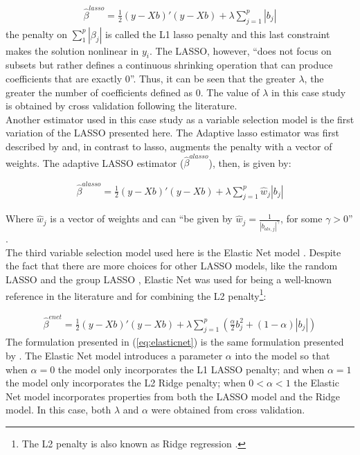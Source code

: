 \begin{align} \label{eq:lasso}
    \hat{\beta}^{lasso} = \frac{1}{2}(y - Xb)'(y - Xb) + \lambda\sum_{j=1}^p|b_j|
\end{align}
the penalty on $\sum_1 ^p |\beta_j|$ is called the L1 lasso penalty \cite[p.68]{hastie2009elements} and this last constraint makes the solution nonlinear in $y_i$. The LASSO, however, ``does not focus on subsets but rather defines a continuous shrinking operation that can produce coefficients that are exactly 0''\cite[p.286]{tibshirani1996regression}. Thus, it can be seen that the greater $\lambda$, the greater the number of coefficients defined as 0. The value of $\lambda$ in this case study is obtained by cross validation following the literature\cite[p. 136]{hoornweg2018science}.\\

Another estimator used in this case study as a variable selection model is the first variation of the LASSO presented here. The  Adaptive lasso estimator was first described by \cite{zou2006adaptive} and, in contrast to lasso, augments the penalty with a vector of weights. The adaptive LASSO estimator ($\hat{\beta}^{alasso}$), then, is given by:

\begin{align} \label{eq:lassoadaptive}
    \hat{\beta}^{alasso} = \frac{1}{2}(y - Xb)'(y - Xb) + \lambda\sum_{j=1}^p\hat{w}_j |b_j|
\end{align}

Where $\hat{w}_j$ is a vector of weights and can ``be given by $\hat{w}_j = \frac{1}{|b_{ols, j}|^\gamma}$, for some $ \gamma > 0$'' \cite[p. 115]{hoornweg2018science}.\\

The third variable selection model used here is the Elastic Net model \cite[]{zou2005regularization}. Despite the fact that there are more choices for other LASSO models, like the random LASSO \cite[]{wang2011random} and the group LASSO \cite[]{yuan2006model}, Elastic Net was used for being a well-known reference in the literature and for combining the L2 penalty\footnote{The L2 penalty is also known as Ridge regression \cite[p.2]{owen2007robust}.}:

\begin{align}\label{eq:elasticnet}
    \hat{\beta}^{enet} = \frac{1}{2}(y - Xb)'(y - Xb) + \lambda\sum_{j=1}^p\left(\frac{\alpha}{2}b_j ^2 + (1 - \alpha)|b_j|\right)
\end{align}
The formulation presented in (\ref{eq:elasticnet}) is the same formulation presented by \cite{hastie2009elements}. The Elastic Net model introduces a parameter $\alpha$ into the model so that when $\alpha = 0$ the model only incorporates the L1 LASSO penalty; and when $\alpha = 1$ the model only incorporates the L2 Ridge penalty; when $0 < \alpha < 1$ the Elastic Net model incorporates properties from both the LASSO model and the Ridge model. In this case, both $\lambda$ and $\alpha$ were obtained from cross validation.


